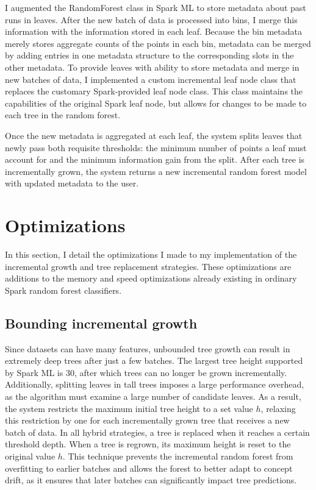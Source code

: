 I augmented the RandomForest class in Spark ML to store metadata about past
runs in leaves. After the new batch of data is processed into bins, I merge
this information with the information stored in each leaf. Because the bin
metadata merely stores aggregate counts of the points in each bin, metadata can
be merged by adding entries in one metadata structure to the corresponding
slots in the other metadata. To provide leaves with ability to store metadata
and merge in new batches of data, I implemented a custom incremental leaf node
class that replaces the customary Spark-provided leaf node class. This class
maintains the capabilities of the original Spark leaf node, but allows for
changes to be made to each tree in the random forest.

Once the new metadata is aggregated at each leaf, the system splits leaves that
newly pass both requisite thresholds: the minimum number of points a leaf must
account for and the minimum information gain from the split. After each tree is
incrementally grown, the system returns a new incremental random forest model
with updated metadata to the user.

\section{Optimizations}

In this section, I detail the optimizations I made to my implementation of the
incremental growth and tree replacement strategies. These optimizations are
additions to the memory and speed optimizations already existing in ordinary
Spark random forest classifiers.

\subsection{Bounding incremental growth}

Since datasets can have many features, unbounded tree growth can result in
extremely deep trees after just a few batches. The largest tree height
supported by Spark ML is 30, after which trees can no longer be grown
incrementally. Additionally, splitting leaves in tall trees imposes a large
performance overhead, as the algorithm must examine a large number of candidate
leaves. As a result, the system restricts the maximum initial tree height to a
set value $h$, relaxing this restriction by one for each incrementally grown
tree that receives a new batch of data. In all hybrid strategies, a tree is
replaced when it reaches a certain threshold depth. When a tree is regrown, its
maximum height is reset to the original value $h$. This technique prevents the
incremental random forest from overfitting to earlier batches and allows the
forest to better adapt to concept drift, as it ensures that later batches can
significantly impact tree predictions.

